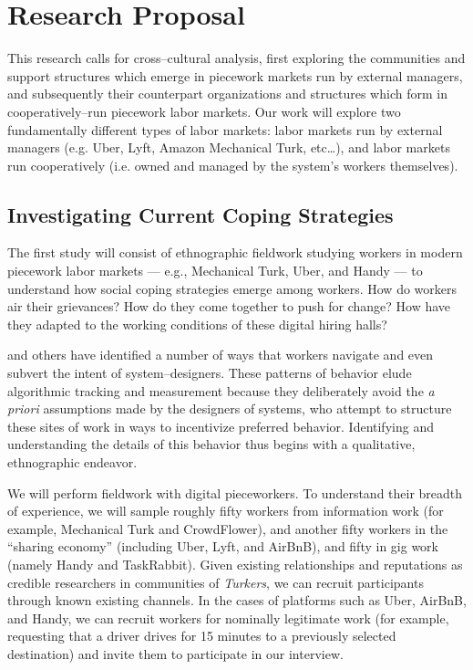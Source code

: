 \documentclass[11pt]{article}
\begin{document}
\section{Research Proposal}
This research calls for cross--cultural analysis,
first exploring the communities and support structures which emerge in piecework markets run by external managers,
and subsequently their counterpart organizations and structures which form in cooperatively--run piecework labor markets.
Our work will explore two fundamentally different types of labor markets: labor markets run by external managers
(e.g. Uber, Lyft, Amazon Mechanical Turk, etc\dots),
and labor markets run cooperatively
(i.e. owned and managed by the system's workers themselves).

\subsection{Investigating Current Coping Strategies}\label{ethnography}
The first study will consist of ethnographic fieldwork studying workers in modern piecework labor markets
--- e.g., Mechanical Turk, Uber, and Handy ---
to understand how social coping strategies emerge among workers.
How do workers air their grievances?
How do they come together to push for change?
How have they adapted to the working conditions of these digital hiring halls?

\citet{uberAlgorithm}
and others have identified a number of ways that workers
  navigate and even
  subvert the intent of system--designers.
These patterns of behavior elude
  algorithmic tracking and
  measurement
because they deliberately avoid the \textit{a priori} assumptions made by the designers of systems,
who attempt to structure these sites of work in ways to incentivize preferred behavior.
Identifying and understanding the details of this behavior thus begins with a
  qualitative,
  ethnographic
endeavor.

We will perform fieldwork with digital pieceworkers.
To understand their breadth of experience,
we will sample roughly fifty workers from information work
(for example, Mechanical Turk and CrowdFlower),
and another
fifty workers in the ``sharing economy''
(including
  Uber,
  Lyft, and
  AirBnB),
and fifty in gig work
(namely Handy and TaskRabbit).
Given
  existing relationships and
  reputations
as credible researchers in communities of \textit{Turkers},
we can recruit participants through known existing channels.
In the cases of platforms such as
  Uber,
  AirBnB, and
  Handy,
we can recruit workers for nominally legitimate work
(for example, requesting that a driver drives for 15 minutes to a previously selected destination)
and invite them to participate in our interview.
\end{document}
